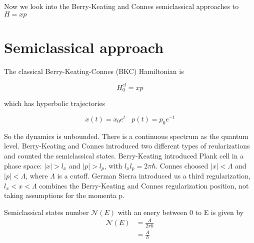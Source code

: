 \documentclass[12pt, letterpaper]{article}
\newcommand*{\1}{\hspace{1pt}}
\begin{document}
    Now we look into the Berry-Keating and Connes semiclassical approaches to $H=xp$

    \section{Semiclassical approach}

    The classical Berry-Keating-Connes (BKC) Hamiltonian is\cite{s1,s2}

    \begin{equation}
        H ^{cl} _{0} = xp
    \end{equation}

    which has hyperbolic trajectories 
    
    \begin{equation}
        x(t) = x_{0}e^{t}  \ \ \ \  p(t) = p_{0}e^{-t}
    \end{equation}

    So the dynamics is unbounded. There is a continuous spectrum as the quantum level. Berry-Keating and Connes introduced two different types of reularizations and counted
    the semiclassical states. Berry-Keating introduced Plank cell in a phase space: $|x| > l_{x}$ and $|p| > l_{p}$, with $l_{x}l_{p} = 2 \pi \hbar$. Connes 
    choosed $|x| < \Lambda $ and $|p| < \Lambda$, where $\Lambda$ is a cutoff. German Sierra introduced us a third regularization, $l_{x} < x < \Lambda$ combines
    the Berry-Keating and Connes regularization position, not taking assumptions for the momenta p. \

    Semiclassical states number $\mathcal {N}(E)$ with an enery between 0 to E is given by
    \begin{equation}
        \begin{split}
            \mathcal {N}(E) &= \frac{A}{2 \pi \hbar} \\
            &= \frac{A}{h}
        \end{split}
    \end{equation}
\end{document}
